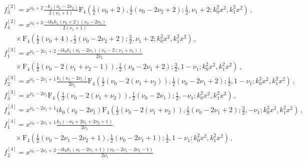 \documentclass[a4paper,11pt]{article}
\newcommand{\nn}{\nonumber}
\begin{document}
\begin{align}
&f_{3}^{[2]}=
x^{\nu _0+2} \frac{- k_1 \left(\nu _0-2 \nu _2\right) }{2 \left(\nu _1+1\right)}
\text{F}_4\left(\frac{1}{2} \left(\nu _0+2\right),\frac{1}{2} \left(\nu _0-2 \nu _2+2\right);\frac{1}{2},\nu _1+2;k_0^2 x^2,k_1^2 x^2\right)       \, , \nn\\ 
&f_{4}^{[2]}=
 x^{\nu _0+3} \frac{-i k_0 k_1 \left(\nu _0+2\right) \left(\nu _0-2 \nu _2\right)}{2 \left(\nu _1+1\right)}   
 \nn\\
&~~~~~~~\times
\text{F}_4\left(\frac{1}{2} \left(\nu _0+4\right),\frac{1}{2} \left(\nu _0-2 \nu _2+2\right);\frac{3}{2},\nu _1+2;k_0^2 x^2,k_1^2 x^2\right)  
      \, , \nn\\ 
&f_{1}^{[3]}=
x^{\nu _0-2 \nu _1+2}
\frac{-i k_0 k_1 \left(\nu _0-2 \nu _1\right) \left(\nu _0-2 \left(\nu _1+\nu _2\right)\right) }{2 \nu _1} \nn\\
&~~~~~~~\times
\text{F}_4\left(\frac{1}{2} \left(\nu _0-2 \left(\nu _1+\nu _2-1\right)\right),\frac{1}{2} \left(\nu _0-2 \nu _1+2\right);\frac{3}{2},1-\nu _1;k_0^2 x^2,k_1^2 x^2\right)      \, , \nn\\ 
&f_{2}^{[3]}=
x^{\nu _0-2 \nu _1+1}
\frac{k_1 \left(\nu _0-2 \nu _1\right) }{2 \nu _1}
\text{F}_4\left(\frac{1}{2} \left(\nu _0-2 \left(\nu _1+\nu _2\right)\right),\frac{1}{2} \left(\nu _0-2 \nu _1+2\right);\frac{1}{2},1-\nu _1;k_0^2 x^2,k_1^2 x^2\right)       \, , \nn\\ 
&f_{3}^{[3]}=
x^{\nu _0-2 \nu _1}
\text{F}_4\left(\frac{1}{2} \left(\nu _0-2 \left(\nu _1+\nu _2\right)\right),\frac{1}{2} \left(\nu _0-2 \nu _1\right);\frac{1}{2},-\nu _1;k_0^2 x^2,k_1^2 x^2\right)       \, , \nn\\ 
&f_{4}^{[3]}=
x^{\nu _0-2 \nu _1+1}
i k_0 \left(\nu _0-2 \nu _1\right) 
\text{F}_4\left(\frac{1}{2} \left(\nu _0-2 \left(\nu _1+\nu _2\right)\right),\frac{1}{2} \left(\nu _0-2 \nu _1+2\right);\frac{3}{2},-\nu _1;k_0^2 x^2,k_1^2 x^2\right)  
      \, , \nn\\ 
&f_{1}^{[4]}=
x^{\nu _0-2 \nu _1+1}
\frac{k_1 \left(-\nu _0+2 \nu _1+2 \nu _2+1\right) }{2 \nu _1}   \nn\\
&~~~~~~~\times
\text{F}_4\left(\frac{1}{2} \left(\nu _0-2 \nu _1-2 \nu _2+1\right),\frac{1}{2} \left(\nu _0-2 \nu _1+1\right);\frac{1}{2},1-\nu _1;k_0^2 x^2,k_1^2 x^2\right)      \, , \nn\\ 
&f_{2}^{[4]}=
x^{\nu _0-2 \nu _1+2}\frac{-i k_0 k_1 \left(\nu _0-2 \nu _1+1\right) \left(\nu _0-2 \nu _1-2 \nu _2-1\right) }{2 \nu _1}   \nn\\

\end{align}
\end{document}
